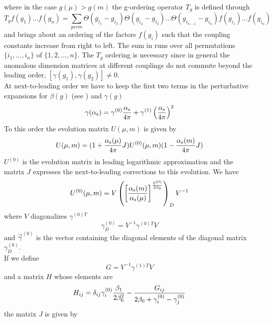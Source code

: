 where in the case $g(\mu)>g(m)$ the g-ordering operator $T_g$ is
defined through
\begin{equation}\label{tgdf}
T_g f(g_1)\ldots f(g_n)=\sum_{perm}
\Theta(g_{i_1}-g_{i_2})\Theta(g_{i_2}-g_{i_3})\ldots
\Theta(g_{i_{n-1}}-g_{i_n})f(g_{i_1})\ldots f(g_{i_n}) \end{equation}
and brings about an ordering of the factors $f(g_i)$ such that the
coupling constants increase from right to left. The sum in  runs
over all permutations $\{i_1,\ldots, i_n\}$ of $\{1, 2,\ldots, n\}$.
The $T_g$ ordering is necessary since in general the anomalous
dimension matrices at different couplings do not commute beyond the
leading order, $[\gamma(g_1), \gamma(g_2)]\not= 0$.\\
At next-to-leading order we have to keep the first two terms in the
perturbative expansions for $\beta(g)$ (see ) and $\gamma(g)$
\begin{equation}\label{gg01}
\gamma(\alpha_{\rm s})=\gamma^{(0)}\frac{\alpha_{\rm s}}{4 \pi} + \gamma^{(1)}\left(\frac{\alpha_{\rm s}}{4 \pi}\right)^2
\end{equation}
To this order the evolution matrix $U(\mu, m)$ is given by
\cite{burasetal:92a}
\begin{equation}\label{u0jj}
U(\mu,m)=
(1+{\alpha_{\rm s}(\mu)\over 4\pi} J) U^{(0)}(\mu,m) (1-{\alpha_{\rm s}(m)\over 4\pi} J)
\end{equation}
$U^{(0)}$ is the evolution matrix in leading logarithmic approximation
and the matrix $J$ expresses the next-to-leading corrections to this
evolution. We have
\begin{equation}\label{u0vd} U^{(0)}(\mu,m)= V
\left({\left[{\alpha_{\rm s}(m)\over\alpha_{\rm s}(\mu)}\right]}^{{\vec\gamma^{(0)}\over 2\beta_0}}
   \right)_D V^{-1}   \end{equation}
where $V$ diagonalizes ${\gamma^{(0)T}}$
\begin{equation}\label{ga0d} \gamma^{(0)}_D=V^{-1} {\gamma^{(0)T}} V  \end{equation}
and $\vec\gamma^{(0)}$ is the vector containing the diagonal elements of
the diagonal matrix $\gamma^{(0)}_D$.\\
If we define
\begin{equation}\label{gvg1} G=V^{-1} {\gamma^{(1)T}} V   \end{equation}
and a matrix $H$ whose elements are
\begin{equation}\label{sij} H_{ij}=\delta_{ij}\gamma^{(0)}_i{\beta_1\over 2\beta^2_0}-
    {G_{ij}\over 2\beta_0+\gamma^{(0)}_i-\gamma^{(0)}_j}  \end{equation}
the matrix $J$ is given by
